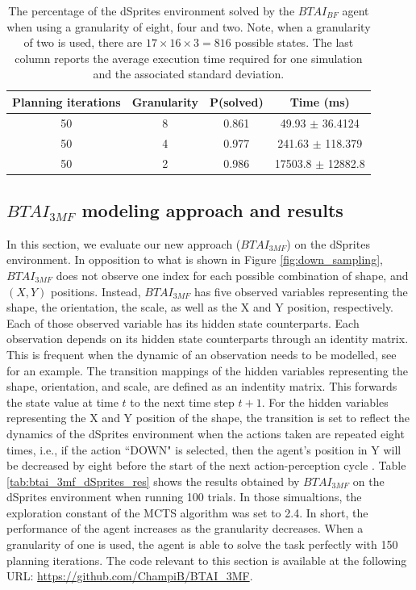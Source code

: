 \documentclass[twoside,11pt]{article}
\begin{document}
\begin{table}[H]
\centering
\begin{tabular}{ |c|c|c|c| }
 \hline
 Planning iterations & Granularity & P(solved) & Time (ms) \\
 \hline
 50 & 8 & 0.861 & 49.93 $\pm$ 36.4124 \\
 \hline
 50 & 4 & 0.977 & 241.63 $\pm$ 118.379 \\
 \hline
 50 & 2 & 0.986 & 17503.8 $\pm$ 12882.8 \\
 \hline
\end{tabular}
\caption{The percentage of the dSprites environment solved by the $BTAI_{BF}$ agent when using a granularity of eight, four and two. Note, when a granularity of two is used, there are $17 \times 16 \times 3 = 816$ possible states. The last column reports the average execution time required for one simulation and the associated standard deviation.}
\label{tab:btai_bf_dSprites_res}
\end{table}

\subsection{$BTAI_{3MF}$ modeling approach and results} \label{ssec:btai_3mf}

In this section, we evaluate our new approach ($BTAI_{3MF}$) on the dSprites environment. In opposition to what is shown in Figure \ref{fig:down_sampling}, $BTAI_{3MF}$ does not observe one index for each possible combination of shape, and $(X, Y)$ positions. Instead, $BTAI_{3MF}$ has five observed variables representing the shape, the orientation, the scale, as well as the X and Y position, respectively. Each of those observed variable has its hidden state counterparts. Each observation depends on its hidden state counterparts through an identity matrix. This is frequent when the dynamic of an observation needs to be modelled, see \citep{10.1162/neco_a_01357} for an example. The transition mappings of the hidden variables representing the shape, orientation, and scale, are defined as an indentity matrix. This forwards the state value at time $t$ to the next time step $t + 1$. For the hidden variables representing the X and Y position of the shape, the transition is set to reflect the dynamics of the dSprites environment when the actions taken are repeated eight times, i.e., if the action ``DOWN" is selected, then the agent's position in Y will be decreased by eight before the start of the next action-perception cycle \citep{DeepAIwithMCMC}. Table \ref{tab:btai_3mf_dSprites_res} shows the results obtained by $BTAI_{3MF}$ on the dSprites environment when running 100 trials. In those simualtions, the exploration constant of the MCTS algorithm was set to 2.4. In short, the performance of the agent increases as the granularity decreases. When a granularity of one is used, the agent is able to solve the task perfectly with 150 planning iterations. The code relevant to this section is available at the following URL: \url{https://github.com/ChampiB/BTAI_3MF}.
\end{document}
